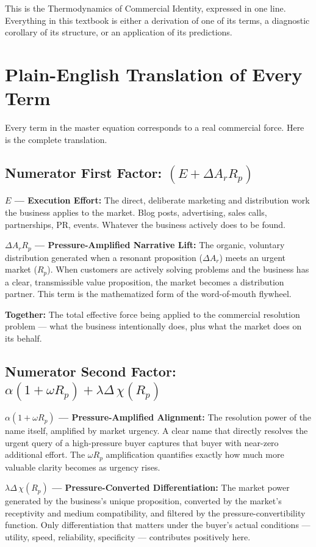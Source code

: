 \documentclass[12pt, openany]{book}
\theoremstyle{thmstyle}
\theoremstyle{defstyle}
\begin{document}
This is the Thermodynamics of Commercial Identity, expressed in one line. Everything in this textbook is either a derivation of one of its terms, a diagnostic corollary of its structure, or an application of its predictions.

\section{Plain-English Translation of Every Term}

Every term in the master equation corresponds to a real commercial force. Here is the complete translation.

\subsection{Numerator First Factor: $(E + \Delta A_r R_p)$}

\textbf{$E$ --- Execution Effort:} The direct, deliberate marketing and distribution work the business applies to the market. Blog posts, advertising, sales calls, partnerships, PR, events. Whatever the business actively does to be found.

\textbf{$\Delta A_r R_p$ --- Pressure-Amplified Narrative Lift:} The organic, voluntary distribution generated when a resonant proposition ($\Delta A_r$) meets an urgent market ($R_p$). When customers are actively solving problems and the business has a clear, transmissible value proposition, the market becomes a distribution partner. This term is the mathematized form of the word-of-mouth flywheel.

\textbf{Together:} The total effective force being applied to the commercial resolution problem --- what the business intentionally does, plus what the market does on its behalf.

\subsection{Numerator Second Factor: $\alpha(1 + \omega R_p) + \lambda\Delta\,\chi(R_p)$}

\textbf{$\alpha(1 + \omega R_p)$ --- Pressure-Amplified Alignment:} The resolution power of the name itself, amplified by market urgency. A clear name that directly resolves the urgent query of a high-pressure buyer captures that buyer with near-zero additional effort. The $\omega R_p$ amplification quantifies exactly how much more valuable clarity becomes as urgency rises.

\textbf{$\lambda\Delta\,\chi(R_p)$ --- Pressure-Converted Differentiation:} The market power generated by the business's unique proposition, converted by the market's receptivity and medium compatibility, and filtered by the pressure-convertibility function. Only differentiation that matters under the buyer's actual conditions --- utility, speed, reliability, specificity --- contributes positively here.
\end{document}

